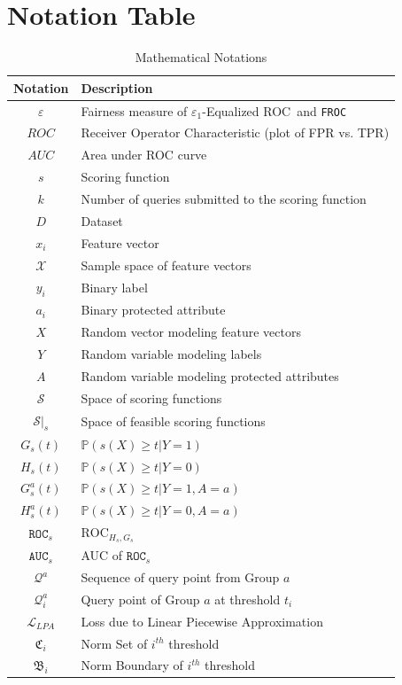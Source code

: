 \documentclass{article}
\newcommand{\ouralgo}{\texttt{FROC}}
\newcommand{\ourdef}{-Equalized ROC}
\newcommand{\roc}{\texttt{ROC}_s}
\begin{document}
\section{Notation Table}
\begin{table}[H]
  \centering
  \begin{tabular}{c p{}}
    \toprule
    \textbf{Notation} & \textbf{Description} \\
    \midrule
    $\varepsilon$ & Fairness measure of $\varepsilon_1$\ourdef\ and \ouralgo \\
    $ROC$ & Receiver Operator Characteristic (plot of FPR vs. TPR) \\
    $AUC$ & Area under ROC curve \\
    $s$ & Scoring function \\
    $k$ & Number of queries submitted to the scoring function \\
    $D$ & Dataset \\
    $x_i$ & Feature vector \\
    $\mathcal{X}$ & Sample space of feature vectors  \\
    $y_i$ & Binary label \\
    $a_i$ & Binary protected attribute \\
    $X$ & Random vector modeling feature vectors \\
    $Y$ & Random variable modeling labels \\
    $A$ & Random variable modeling protected attributes \\
    $\mathcal{S}$ & Space of scoring functions \\
    $\mathcal{S}|_s$ & Space of feasible scoring functions\\
    $G_s(t)$ & $\mathbb{P}(s(X) \ge t | Y = 1)$ \\
    $H_s(t)$ & $\mathbb{P}(s(X) \ge t | Y = 0)$ \\
    $G^a_s(t)$ & $\mathbb{P}(s(X) \ge t | Y = 1, A=a)$ \\
    $H^a_s(t)$ & $\mathbb{P}(s(X) \ge t | Y = 0, A=a)$ \\
    $\roc$& $\mathrm{ROC}_{H_s , G_s}$\\
    $\texttt{AUC}_s$ & AUC of $\roc$\\
    $\mathcal{Q}^a$ & Sequence of query point from Group $a$\\
    $\mathcal{Q}^a_i$ & Query point of Group $a$ at threshold $t_i$\\
    $\mathcal{L}_{LPA}$ & Loss due to Linear Piecewise Approximation\\
    $\mathfrak{C}_i$ & Norm Set of $i^{th}$ threshold\\
    $\mathfrak{B}_i$ & Norm Boundary of $i^{th}$ threshold\\
    \bottomrule
  \end{tabular}
  \caption{Mathematical Notations}
  \label{tab:notations}
\end{table}
\end{document}
